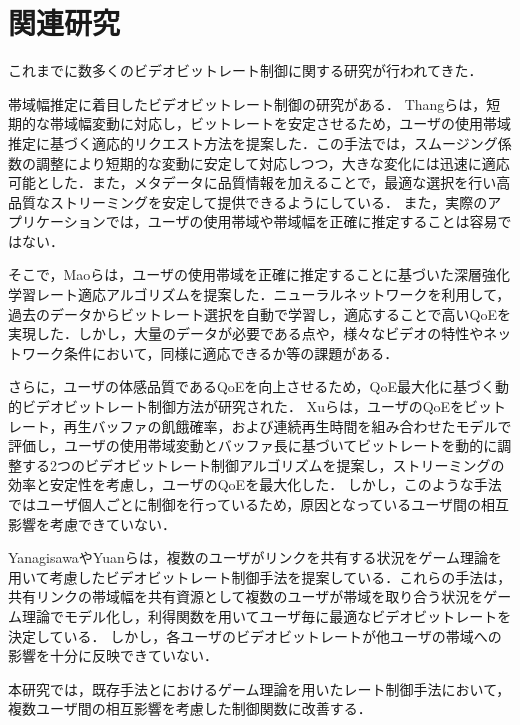 \chapter{関連研究}

これまでに数多くのビデオビットレート制御に関する研究が行われてきた．

帯域幅推定に着目したビデオビットレート制御の研究がある．
Thangら\cite{Thang}は，短期的な帯域幅変動に対応し，ビットレートを安定させるため，ユーザの使用帯域推定に基づく適応的リクエスト方法を提案した．この手法では，スムージング係数の調整により短期的な変動に安定して対応しつつ，大きな変化には迅速に適応可能とした．また，メタデータに品質情報を加えることで，最適な選択を行い高品質なストリーミングを安定して提供できるようにしている．
また，実際のアプリケーションでは，ユーザの使用帯域や帯域幅を正確に推定することは容易ではない．

そこで，Maoら\cite{Mao}は，ユーザの使用帯域を正確に推定することに基づいた深層強化学習レート適応アルゴリズムを提案した．ニューラルネットワークを利用して，過去のデータからビットレート選択を自動で学習し，適応することで高いQoEを実現した．しかし，大量のデータが必要である点や，様々なビデオの特性やネットワーク条件において，同様に適応できるか等の課題がある．

さらに，ユーザの体感品質であるQoEを向上させるため，QoE最大化に基づく動的ビデオビットレート制御方法が研究された．
Xuら\cite{Xu}は，ユーザのQoEをビットレート，再生バッファの飢餓確率，および連続再生時間を組み合わせたモデルで評価し，ユーザの使用帯域変動とバッファ長に基づいてビットレートを動的に調整する2つのビデオビットレート制御アルゴリズムを提案し，ストリーミングの効率と安定性を考慮し，ユーザのQoEを最大化した．
しかし，このような手法ではユーザ個人ごとに制御を行っているため，原因となっているユーザ間の相互影響を考慮できていない．

Yanagisawa\cite{kison}やYuanら\cite{motomoto}は，複数のユーザがリンクを共有する状況をゲーム理論を用いて考慮したビデオビットレート制御手法を提案している．これらの手法は，共有リンクの帯域幅を共有資源として複数のユーザが帯域を取り合う状況をゲーム理論でモデル化し，利得関数を用いてユーザ毎に最適なビデオビットレートを決定している．
しかし，各ユーザのビデオビットレートが他ユーザの帯域への影響を十分に反映できていない．

本研究では，既存手法\cite{kison}と\cite{motomoto}におけるゲーム理論を用いたレート制御手法において，複数ユーザ間の相互影響を考慮した制御関数に改善する．